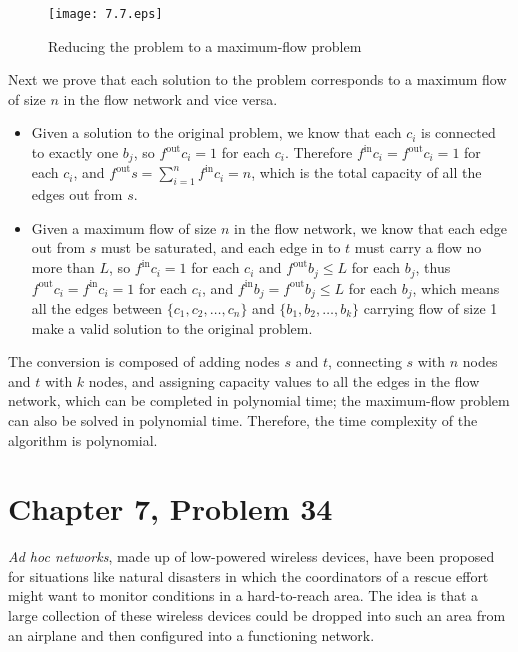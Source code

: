 \documentclass[12pt,letterpaper]{article}
\begin{document}
\begin{figure}
\begin{center}
\texttt{[image: 7.7.eps]}
\caption{Reducing the problem to a maximum-flow problem}
\end{center}
\end{figure}

Next we prove that each solution to the problem corresponds to a maximum flow of size $n$ in the flow network and vice versa.

\begin{itemize}
\item Given a solution to the original problem, we know that each $c_i$ is connected to exactly one $b_j$, so $f^{\textrm{out}}c_i=1$ for each $c_i$. Therefore $f^{\textrm{in}}c_i=f^{\textrm{out}}c_i=1$ for each $c_i$, and $f^{\textrm{out}}s=\sum_{i=1}^{n} f^{\textrm{in}}c_i= n$, which is the total capacity of all the edges out from $s$.
\item Given a maximum flow of size $n$ in the flow network, we know that each edge out from $s$ must be saturated, and each edge in to $t$ must carry a flow no more than $L$, so $f^{\textrm{in}}c_i=1$ for each $c_i$ and $f^{\textrm{out}}b_j\le L$ for each $b_j$, thus $f^{\textrm{out}}c_i=f^{\textrm{in}}c_i=1$ for each $c_i$, and $f^{\textrm{in}}b_j = f^{\textrm{out}}b_j\le L$ for each $b_j$, which means all the edges between $\{c_1, c_2, \dots, c_n\}$ and $\{b_1, b_2, \dots, b_k\}$ carrying flow of size 1 make a valid solution to the original problem.
\end{itemize}

The conversion is composed of adding nodes $s$ and $t$, connecting $s$ with $n$ nodes and $t$ with $k$ nodes, and assigning capacity values to all the edges in the flow network, which can be completed in polynomial time; the maximum-flow problem can also be solved in polynomial time. Therefore, the time complexity of the algorithm is polynomial.

\section*{Chapter 7, Problem 34}
\emph{Ad hoc networks}, made up of low-powered wireless devices, have been
proposed for situations like natural disasters in which the coordinators
of a rescue effort might want to monitor conditions in a hard-to-reach
area. The idea is that a large collection of these wireless devices could be
dropped into such an area from an airplane and then configured into a
functioning network.
\end{document}
